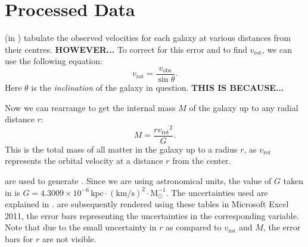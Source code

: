 \documentclass{article}
\newcommand\solmass{\textrm{M}_\odot}
\newcommand\kpc{\textrm{kpc}}
\newcommand\kmps{\textrm{km}/\textrm{s}}
\newcommand\vrot{\ensuremath{v_{\textrm{rot}}}}
\newcommand\vobs{\ensuremath{v_{\textrm{obs}}}}
\begin{document}
\section{Processed Data}\label{sec:processed-data}


% 
% 


 (in ) tabulate the observed velocities for each galaxy at various distances from their centres.
\textbf{HOWEVER...}
To correct for this error and to find \(\vrot\), we can use the following equation:
\begin{equation}\label{eq:vrotfromvobs}
    \vrot = \frac{\vobs}{\sin\theta}.
\end{equation}
Here \(\theta\) is the \textit{inclination} of the galaxy in question.
\textbf{THIS IS BECAUSE...}

Now we can rearrange  to get the internal mass \(M\) of the galaxy up to any radial distance \(r\):
\begin{equation}\label{eq:internalmass}
    M = \frac{r\vrot^2}{G}.
\end{equation}
This is the total mass of all matter in the galaxy up to a radius \(r\), as \(\vrot\) represents the orbital velocity at a distance \(r\) from the center.

 are used to generate .
Since we are using astronomical units, the value of \(G\) taken in  is \(G = 4.3009 \times 10^{-6} \, \kpc \cdot (\kmps)^2 \cdot \solmass^{-1}\).
The uncertainties used are explained in .
 are subsequently rendered using these tables in Microsoft Excel 2011, the error bars representing the uncertainties in the corresponding variable.
Note that due to the small uncertainty in \(r\) as compared to \(\vrot\) and \(M\), the error bars for \(r\) are not visible.
\end{document}

